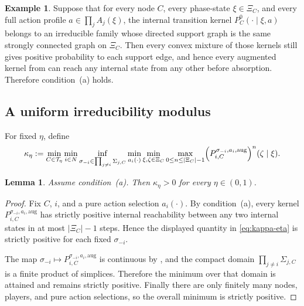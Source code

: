\documentclass[12pt]{article}
\newtheorem{lemma}[theorem]{Lemma}
\theoremstyle{definition}
\newtheorem{example}[theorem]{Example}
\newcommand{\1}{\mathbf{1}}
\newcommand{\cT}{\mathcal{T}}
\begin{document}
\begin{example}
\label{ex:cond-a-trivial}
Suppose that for every node $C$, every phase-state $\xi\in\Xi_C$, and every full
action profile $a\in\prod_j A_j(\xi)$, the internal transition kernel
$P_C^0(\cdot\mid\xi,a)$ belongs to an irreducible family whose directed support
graph is the same strongly connected graph on $\Xi_C$. Then every convex mixture
of those kernels still gives positive probability to each support edge, and hence
every augmented kernel from  can reach any internal state from any
other before absorption. Therefore condition~\textnormal{(a)} holds.
\end{example}

\subsection{A uniform irreducibility modulus}

For fixed $\eta$, define
\begin{equation}
\label{eq:kappa-eta}
\kappa_\eta
:=
\min_{C\in\cT_\eta}
\min_{i\in N}
\inf_{\sigma_{-i}\in\prod_{j\ne i}\Sigma_{j,C}}
\min_{a_i(\cdot)}
\min_{\xi,\zeta\in\Xi_C}
\max_{0\le n\le |\Xi_C|-1}
\Bigl(P_{i,C}^{\sigma_{-i},a_i,\mathrm{aug}}\Bigr)^n(\zeta\mid\xi).
\end{equation}

\begin{lemma}
\label{lem:kappa-positive}
Assume condition~\textnormal{(a)}. Then $\kappa_\eta>0$ for every $\eta\in(0,1)$.
\end{lemma}

\begin{proof}
Fix $C$, $i$, and a pure action selection $a_i(\cdot)$. By
condition~\textnormal{(a)}, every kernel
$P_{i,C}^{\sigma_{-i},a_i,\mathrm{aug}}$ has strictly positive internal
reachability between any two internal states in at most $|\Xi_C|-1$ steps. Hence
the displayed quantity in \eqref{eq:kappa-eta} is strictly positive for each fixed
$\sigma_{-i}$.

The map
$\sigma_{-i}\mapsto P_{i,C}^{\sigma_{-i},a_i,\mathrm{aug}}$ is continuous by
, and the compact domain
$\prod_{j\ne i}\Sigma_{j,C}$ is a finite product of simplices. Therefore the
minimum over that domain is attained and remains strictly positive. Finally there
are only finitely many nodes, players, and pure action selections, so the overall
minimum is strictly positive.
\end{proof}
\end{document}
